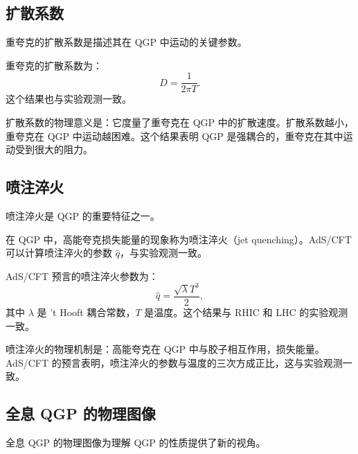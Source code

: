 \subsection{扩散系数}

重夸克的扩散系数是描述其在 QGP 中运动的关键参数。

\begin{proposition}[重夸克扩散系数]
重夸克的扩散系数为：
\begin{equation}
    D = \frac{1}{2\pi T}.
\end{equation}
这个结果也与实验观测一致。
\end{proposition}

\begin{remark}
扩散系数的物理意义是：它度量了重夸克在 QGP 中的扩散速度。扩散系数越小，重夸克在 QGP 中运动越困难。这个结果表明 QGP 是强耦合的，重夸克在其中运动受到很大的阻力。
\end{remark}

\subsection{喷注淬火}

喷注淬火是 QGP 的重要特征之一。

\begin{definition}[喷注淬火]
在 QGP 中，高能夸克损失能量的现象称为喷注淬火（jet quenching）。AdS/CFT 可以计算喷注淬火的参数 $\hat{q}$，与实验观测一致。
\end{definition}

\begin{proposition}[喷注淬火参数]
AdS/CFT 预言的喷注淬火参数为：
\begin{equation}
    \hat{q} = \frac{\sqrt{\lambda} T^3}{2},
\end{equation}
其中 $\lambda$ 是 't Hooft 耦合常数，$T$ 是温度。这个结果与 RHIC 和 LHC 的实验观测一致。
\end{proposition}

\begin{remark}
喷注淬火的物理机制是：高能夸克在 QGP 中与胶子相互作用，损失能量。AdS/CFT 的预言表明，喷注淬火的参数与温度的三次方成正比，这与实验观测一致。
\end{remark}

\subsection{全息 QGP 的物理图像}

全息 QGP 的物理图像为理解 QGP 的性质提供了新的视角。

